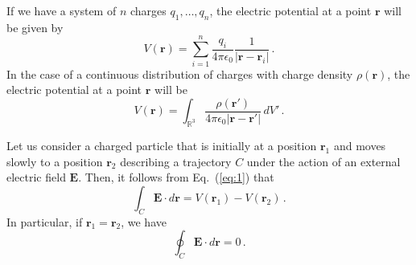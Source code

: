 \documentclass[11pt,a4paper]{article}
\newcommand{\R}{\mathbb{R}}
\theoremstyle{definition}
\begin{document}
If we have a system of $n$ charges $q_1,\ldots,q_n$, the electric
potential at a point $\mathbf{r}$ will be given by
$$V(\mathbf{r})=\sum_{i=1}^n\frac{q_i}{4\pi\epsilon_0}\frac{1}{|\mathbf{r}-\mathbf{r}_i|}\,.$$
In the case of a continuous distribution of charges with charge
density $\rho(\mathbf{r})$, the electric potential at a point
$\mathbf{r}$ will be
$$V(\mathbf{r})=\int_{\R^3}\frac{\rho(\mathbf{r}')}{4\pi\epsilon_0|\mathbf{r}-\mathbf{r}'|}\,dV'\,.$$

Let us consider a charged particle that is initially at a position
$\mathbf{r}_1$ and moves slowly to a position $\mathbf{r}_2$
describing a trajectory $C$ under the action of an external electric
field $\mathbf{E}$. Then, it follows from Eq.~(\ref{eq:1}) that
$$\int_C\mathbf{E}\cdot d\mathbf{r}=V(\mathbf{r}_1)-V(\mathbf{r}_2)\,.$$
In particular, if $\mathbf{r}_1=\mathbf{r}_2$, we have
$$\oint_C\mathbf{E}\cdot d\mathbf{r}=0\,.$$
\end{document}
